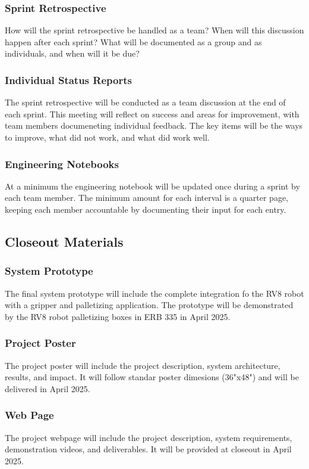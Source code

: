 \subsubsection{Sprint Retrospective}
How will the sprint retrospective be handled as a team? When will this discussion happen after each sprint? What will be documented as a group and as individuals, and when will it be due?

\subsubsection{Individual Status Reports}
The sprint retrospective will be conducted as a team discussion at the end of each sprint. This meeting will reflect on success and areas for improvement, with team members documeneting individual feedback. The key items will be the ways to improve, what did not work, and what did work well.

\subsubsection{Engineering Notebooks}
At a minimum the engineering notebook will be updated once during a sprint by each team member. The minimum amount for each interval is a quarter page, keeping each member accountable by documenting their input for each entry.

\subsection{Closeout Materials}

\subsubsection{System Prototype}
The final system prototype will include the complete integration fo the RV8 robot with a gripper and palletizing application. The prototype will be demonstrated by the RV8 robot palletizing boxes in ERB 335 in April 2025.
\subsubsection{Project Poster}
The project poster will include the project description, system architecture, results, and impact. It will follow standar poster dimesions (36"x48") and will be delivered in April 2025.

\subsubsection{Web Page}
The project webpage will include the project description, system requirements, demonstration videos, and deliverables. It will be provided at closeout in April 2025.

